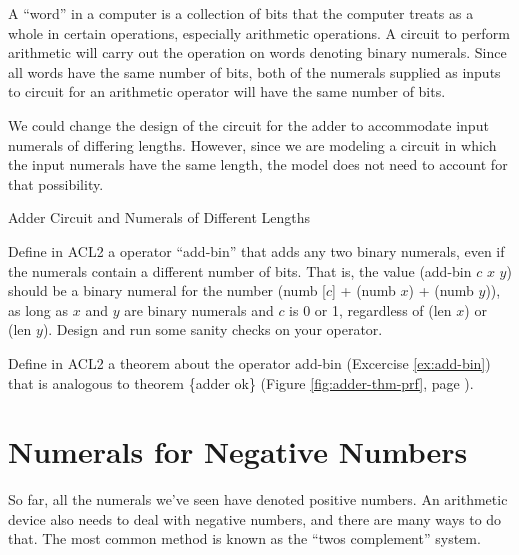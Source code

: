 \begin{aside}
A ``word'' in a computer is a collection of bits
that the computer treats as a whole in certain operations,
especially arithmetic operations.
A circuit to perform arithmetic will carry out
the operation on words denoting binary numerals.
Since all words have the same number of bits,
both of the numerals supplied as inputs to circuit
for an arithmetic operator will have the same number of bits.

We could change the design of the circuit for the adder
to accommodate input numerals of differing lengths.
However, since we are modeling a circuit
in which the input numerals have the same length,
the model does not need to account for that possibility.
\caption{Adder Circuit and Numerals of Different Lengths}
\label{adder-circuit-and-numerals-of-different-lengths}
\end{aside}

\begin{ExerciseList}
\Exercise \label{ex:add-bin}
Define in ACL2 a operator ``add-bin''
that adds any two binary numerals,
even if the numerals contain a different number of bits.
That is, the value (add-bin $c$ $x$ $y$) should be a binary numeral
for the number (numb [$c$] + (numb $x$) + (numb $y$)),
as long as $x$ and $y$ are binary numerals and $c$ is 0 or 1,
regardless of (len $x$) or (len $y$).
Design and run some sanity checks on your operator.

\Exercise Define in ACL2 a theorem about the operator add-bin (Excercise \ref{ex:add-bin})
that is analogous to theorem \{adder ok\}
(Figure \ref{fig:adder-thm-prf}, page \pageref{fig:adder-thm-prf}).

\end{ExerciseList}

\section{Numerals for Negative Numbers}
\label{sec:negative-numerals}

So far, all the numerals we've seen have denoted positive numbers.
An arithmetic device also needs to deal with negative numbers,
and there are many ways to do that.
The most common method is known as the
``twos complement'' system.


